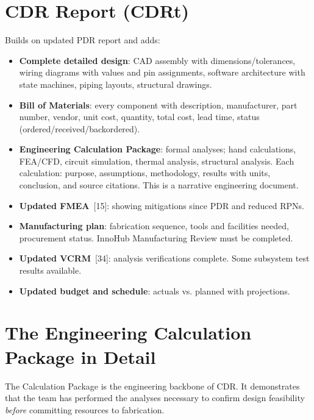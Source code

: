 \section{CDR Report (CDRt)}
Builds on updated PDR report and adds:
\begin{itemize}[nosep,leftmargin=1.5em]
\item \textbf{Complete detailed design}: CAD assembly with dimensions/tolerances, wiring diagrams with values and pin assignments, software architecture with state machines, piping layouts, structural drawings.
\item \textbf{Bill of Materials}: every component with description, manufacturer, part number, vendor, unit cost, quantity, total cost, lead time, status (ordered/received/backordered).
\item \textbf{Engineering Calculation Package}: formal analyses; hand calculations, FEA/CFD, circuit simulation, thermal analysis, structural analysis. Each calculation: purpose, assumptions, methodology, results with units, conclusion, and source citations. This is a narrative engineering document.
\item \textbf{Updated FMEA}~[15]: showing mitigations since PDR and reduced RPNs.
\item \textbf{Manufacturing plan}: fabrication sequence, tools and facilities needed, procurement status. InnoHub Manufacturing Review must be completed.
\item \textbf{Updated VCRM}~[34]: analysis verifications complete. Some subsystem test results available.
\item \textbf{Updated budget and schedule}: actuals vs. planned with projections.
\end{itemize}

\section{The Engineering Calculation Package in Detail}
The Calculation Package is the engineering backbone of CDR. It demonstrates that the team has performed the analyses necessary to confirm design feasibility \emph{before} committing resources to fabrication.

